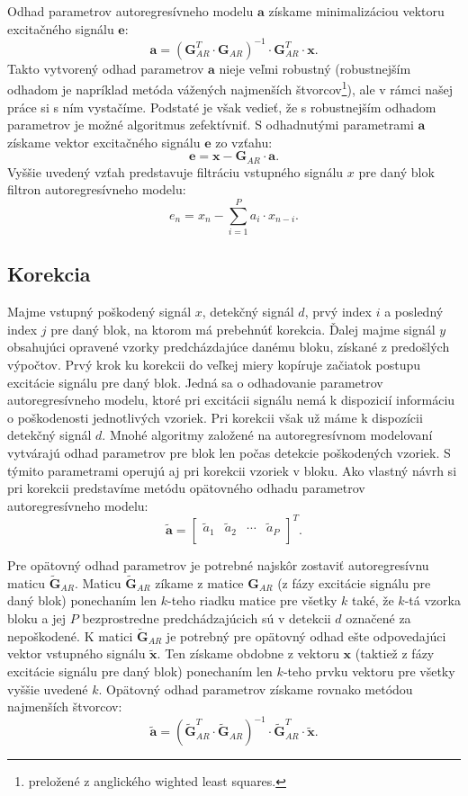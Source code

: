 Odhad parametrov autoregresívneho modelu $\mathbf{a}$ získame minimalizáciou vektoru excitačného signálu $\mathbf{e}$: 
$$\mathbf{a}=(\mathbf{G}_{AR}^T \cdot \mathbf{G}_{AR})^{-1} \cdot \mathbf{G}_{AR}^T \cdot \mathbf{x}.$$ 
Takto vytvorený odhad parametrov $\mathbf{a}$ nieje veľmi robustný (robustnejším odhadom je napríklad metóda vážených najmenších štvorcov\footnote{preložené z anglického wighted least squares.}), ale v rámci našej práce si s ním vystačíme. Podstaté je však vedieť, že s robustnejším odhadom parametrov je možné algoritmus zefektívniť. S odhadnutými parametrami $\mathbf{a}$ získame vektor excitačného signálu $\mathbf{e}$ zo vzťahu:
$$\mathbf{e}= \mathbf{x} - \mathbf{G}_{AR} \cdot \mathbf{a}.$$
Vyššie uvedený vzťah predstavuje filtráciu vstupného signálu $x$ pre daný blok filtron autoregresívneho modelu:
$$e_n = x_n - \sum_{i=1}^P a_i \cdot x_{n-i}.$$

\subsection{Korekcia}
Majme vstupný poškodený signál $x$, detekčný signál $d$, prvý index $i$ a posledný index $j$ pre daný blok, na ktorom má prebehnúť korekcia. Ďalej majme signál $y$ obsahujúci opravené vzorky predcházdajúce danému bloku, získané z predošlých výpočtov. Prvý krok ku korekcii do veľkej miery kopíruje začiatok postupu excitácie signálu pre daný blok. Jedná sa o odhadovanie parametrov autoregresívneho modelu, ktoré pri excitácii signálu nemá k dispozicií informáciu o poškodenosti jednotlivých vzoriek. Pri korekcii však už máme k dispozícii detekčný signál $d$. Mnohé algoritmy založené na autoregresívnom modelovaní vytvárajú odhad parametrov pre blok len počas detekcie poškodených vzoriek. S týmito parametrami operujú aj pri korekcii vzoriek v bloku. Ako vlastný návrh si pri korekcii predstavíme metódu opätovného odhadu parametrov autoregresívneho modelu: $$\mathbf{\tilde{a}}=\begin{bmatrix} 
  \tilde{a}_1 & \tilde{a}_2 & \cdots & \tilde{a}_P\\
\end{bmatrix}^T.$$

Pre opätovný odhad parametrov je potrebné najskôr zostaviť autoregresívnu maticu $\mathbf{\tilde{G}}_{AR}$. Maticu $\mathbf{\tilde{G}}_{AR}$ zíkame z matice $\mathbf{G}_{AR}$ (z fázy excitácie signálu pre daný blok) ponechaním len $k$-teho riadku matice pre všetky $k$ také, že $k$-tá vzorka bloku a jej $P$ bezprostredne predchádzajúcich sú v detekcii $d$ označené za nepoškodené. K matici $\mathbf{\tilde{G}}_{AR}$ je potrebný pre opätovný odhad ešte odpovedajúci vektor vstupného signálu $\mathbf{\tilde{x}}$. Ten získame obdobne z vektoru $\mathbf{x}$ (taktiež z fázy excitácie signálu pre daný blok) ponechaním len $k$-teho prvku vektoru pre všetky vyššie uvedené $k$. Opätovný odhad parametrov získame rovnako metódou najmenších štvorcov:
$$\mathbf{\tilde{a}}=(\mathbf{\tilde{G}}_{AR}^T \cdot \mathbf{\tilde{G}}_{AR})^{-1} \cdot \mathbf{\tilde{G}}_{AR}^T \cdot \mathbf{\tilde{x}}.$$ 

